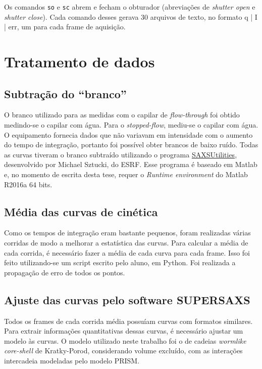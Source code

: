 			Os comandos \texttt{so} e \texttt{sc} abrem e fecham o obturador (abreviações de \emph{shutter open} e \emph{shutter close}). Cada comando desses gerava 30 arquivos de texto, no formato q | I | err, um para cada frame de aquisição. 

		\section{Tratamento de dados}
			\subsection{Subtração do ``branco''}
			
			O branco utilizado para as medidas com o capilar de \emph{flow-through} foi obtido medindo-se o capilar com água. Para o \emph{stopped-flow}, mediu-se o capilar com água. O equipamento fornecia dados que não variavam em intensidade com o aumento do tempo de integração, portanto foi possível obter brancos de baixo ruído. Todas as curvas tiveram o branco subtraído utilizando o programa \href{http://www.sztucki.de/SAXSutilities/}{SAXSUtilities}, desenvolvido por Michael Sztucki, do ESRF. Esse programa é baseado em Matlab e, no momento de escrita desta tese, requer o \emph{Runtime environment} do Matlab R2016a 64 bits.
			
			\subsection{Média das curvas de cinética}
			
			Como os tempos de integração eram bastante pequenos, foram realizadas várias corridas de modo a melhorar a estatística das curvas. Para calcular a média de cada corrida, é necessário fazer a média de cada curva para cada frame. Isso foi feito utilizando-se um script escrito pelo aluno, em Python. Foi realizada a propagação de erro de todos os pontos. %
			
			\subsection{Ajuste das curvas pelo software SUPERSAXS}
			
			Todos os frames de cada corrida média possuíam curvas com formatos similares. Para extrair informações quantitativas dessas curvas, é necessário ajustar um modelo às curvas. O modelo utilizado neste trabalho foi o de cadeias \emph{wormlike} \emph{core-shell} de Kratky-Porod, considerando volume excluído, com as interações intercadeia modeladas pelo modelo PRISM. 
			
